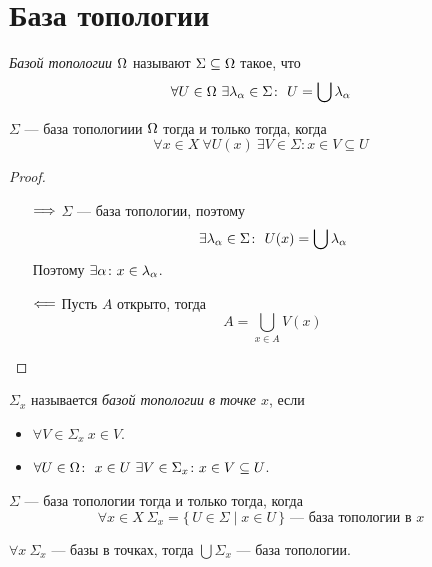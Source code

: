 \section{База топологии}

\begin{definition}
	\textit{Базой топологии} $\Omega$ называют $\Sigma \subseteq \Omega$ такое, что
\[
	\forall U \in \Omega~ \exists \lambda_\alpha \in \Sigma\colon~ U = \bigcup{\lambda_\alpha}
\]
\end{definition}

\begin{theorem}
	$\Sigma$ --- база топологиии $\Omega$ тогда и только тогда, когда
\[
	\forall x \in X~ \forall U(x)~ \exists V \in \Sigma \colon x \in V \subseteq U
\]
\end{theorem}
\begin{proof}
	\enewline
	\begin{itemize}
		\item[$\Longrightarrow$] $\Sigma$ --- база топологии, поэтому
\[
	\exists \lambda_\alpha \in \Sigma\colon~ U(x) = \bigcup{\lambda_\alpha}
\]
		Поэтому $\exists \alpha\colon x \in \lambda_\alpha$.
		\item[$\Longleftarrow$] Пусть $A$ открыто, тогда
\[
	A = \bigcup_{x \in A}{V(x)}
\]
	\end{itemize}
\end{proof}

\begin{definition}
	$\Sigma_x$ называется \textit{базой топологии в точке $x$}, если
	\begin{itemize}
		\item $\forall V \in \Sigma_x~ x \in V$.
		\item $\forall U \in \Omega\colon~ x \in U~ \exists V \in \Sigma_x\colon x \in V 
			\subseteq U$.
	\end{itemize}
\end{definition}

\begin{remark}
	$\Sigma$ --- база топологии тогда и только тогда, когда
\[
	\forall x \in X~ \Sigma_x = \{\, U \in \Sigma \mid x \in U \,\}
	\text{ --- база топологии в } x
\]
\end{remark}

\begin{remark}
	$\forall x~ \Sigma_x$ --- базы в точках, тогда
	$\bigcup{\Sigma_x}$ --- база топологии.
\end{remark}

